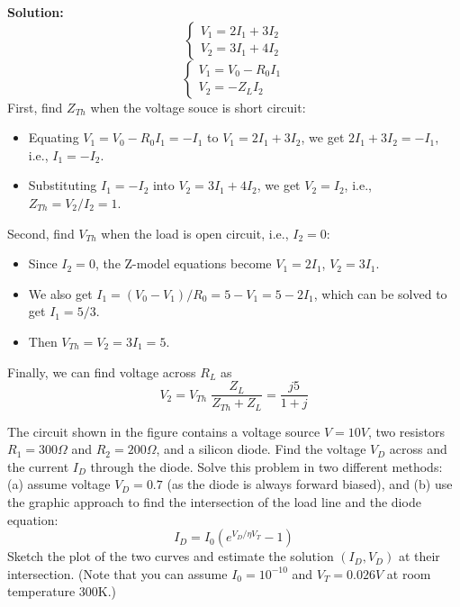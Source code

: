\begin{enumerate}
 {\bf Solution:} 
   \[ \left\{ \begin{array}{l} V_1=2I_1+3I_2 \\ V_2=3I_1+4I_2 \end{array} \right. \]
   \[ \left\{ \begin{array}{l} V_1=V_0-R_0I_1 \\ V_2=-Z_L I_2 \end{array} \right. \]
 First, find $Z_{Th}$ when the voltage souce is short circuit:
 \begin{itemize}
   \item Equating $V_1=V_0-R_0I_1=-I_1$ to $V_1=2I_1+3I_2$, we get
     $ 2I_1+3I_2=-I_1$, i.e., $I_1=-I_2$.
   \item Substituting $I_1=-I_2$ into $V_2=3I_1+4I_2$, we get $ V_2=I_2$, i.e.,
     $Z_{Th}=V_2/I_2=1$.
 \end{itemize}
 Second, find $V_{Th}$ when the load is open circuit, i.e., $I_2=0$:
 \begin{itemize}
   \item Since $I_2=0$, the Z-model equations become $V_1=2I_1$, $V_2=3I_1$.
   \item We also get $I_1=(V_0-V_1)/R_0=5-V_1=5-2I_1$, which can be solved to 
     get $I_1=5/3$.
   \item Then $V_{Th}=V_2=3I_1=5$.
 \end{itemize}
 Finally, we can find voltage across $R_L$ as
 \[V_2=V_{Th}\;\frac{Z_L}{Z_{Th}+Z_L}=\frac{j5}{1+j} \]

\end{enumerate}


\item The circuit shown in the figure contains a voltage source $V=10V$,
two resistors $R_1=300\Omega$ and $R_2=200\Omega$, and a silicon diode.
Find the voltage $V_D$ across and the current $I_D$ through the diode.
Solve this problem in two different methods: (a) assume voltage $V_D=0.7$ 
(as the diode is always forward biased), and (b) use the graphic approach
to find the intersection of the load line and the diode equation:
\[ I_D=I_0 ( e^{V_D/\eta V_T}-1 ) \]
Sketch the plot of the two curves and estimate the solution $(I_D,V_D)$
at their intersection. (Note that you can assume $I_0=10^{-10}$ and 
$V_T=0.026V$ at room temperature 300K.)



